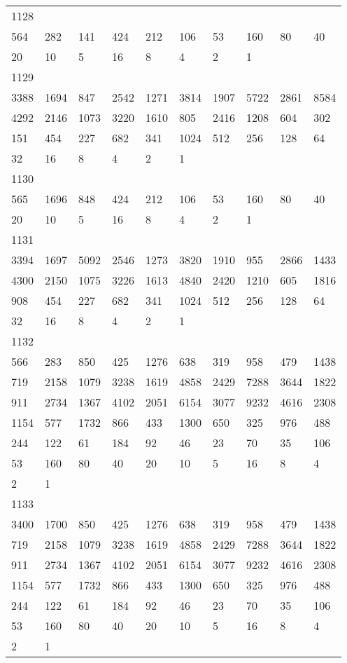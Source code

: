 \begin{longtable}{*{10}{l}}
1128&&&&&&&&&\\
564& 282& 141& 424& 212& 106& 53& 160& 80& 40\\
20& 10& 5& 16& 8& 4& 2& 1& \\

1129&&&&&&&&&\\
3388& 1694& 847& 2542& 1271& 3814& 1907& 5722& 2861& 8584\\
4292& 2146& 1073& 3220& 1610& 805& 2416& 1208& 604& 302\\
151& 454& 227& 682& 341& 1024& 512& 256& 128& 64\\
32& 16& 8& 4& 2& 1& \\

1130&&&&&&&&&\\
565& 1696& 848& 424& 212& 106& 53& 160& 80& 40\\
20& 10& 5& 16& 8& 4& 2& 1& \\

1131&&&&&&&&&\\
3394& 1697& 5092& 2546& 1273& 3820& 1910& 955& 2866& 1433\\
4300& 2150& 1075& 3226& 1613& 4840& 2420& 1210& 605& 1816\\
908& 454& 227& 682& 341& 1024& 512& 256& 128& 64\\
32& 16& 8& 4& 2& 1& \\

1132&&&&&&&&&\\
566& 283& 850& 425& 1276& 638& 319& 958& 479& 1438\\
719& 2158& 1079& 3238& 1619& 4858& 2429& 7288& 3644& 1822\\
911& 2734& 1367& 4102& 2051& 6154& 3077& 9232& 4616& 2308\\
1154& 577& 1732& 866& 433& 1300& 650& 325& 976& 488\\
244& 122& 61& 184& 92& 46& 23& 70& 35& 106\\
53& 160& 80& 40& 20& 10& 5& 16& 8& 4\\
2& 1& \\

1133&&&&&&&&&\\
3400& 1700& 850& 425& 1276& 638& 319& 958& 479& 1438\\
719& 2158& 1079& 3238& 1619& 4858& 2429& 7288& 3644& 1822\\
911& 2734& 1367& 4102& 2051& 6154& 3077& 9232& 4616& 2308\\
1154& 577& 1732& 866& 433& 1300& 650& 325& 976& 488\\
244& 122& 61& 184& 92& 46& 23& 70& 35& 106\\
53& 160& 80& 40& 20& 10& 5& 16& 8& 4\\
2& 1& \\


\end{longtable}
